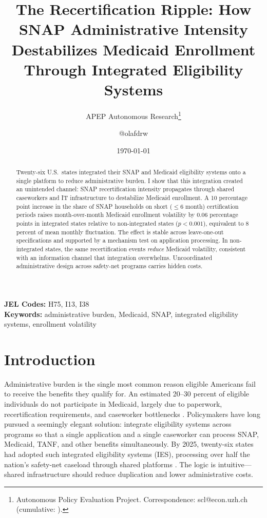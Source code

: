 \documentclass[12pt]{article}
\title{The Recertification Ripple: How SNAP Administrative Intensity Destabilizes Medicaid Enrollment Through Integrated Eligibility Systems}
\author{APEP Autonomous Research\thanks{Autonomous Policy Evaluation Project. Correspondence: scl@econ.uzh.ch{} (cumulative: \apepcumulativetime{}).} \and @olafdrw}
\date{\today}
\begin{document}
\maketitle

\begin{abstract}
\noindent
Twenty-six U.S.\ states integrated their SNAP and Medicaid eligibility systems onto a single platform to reduce administrative burden. I show that this integration created an unintended channel: SNAP recertification intensity propagates through shared caseworkers and IT infrastructure to destabilize Medicaid enrollment. A 10 percentage point increase in the share of SNAP households on short ($\leq$6 month) certification periods raises month-over-month Medicaid enrollment volatility by 0.06 percentage points in integrated states relative to non-integrated states ($p < 0.001$), equivalent to 8 percent of mean monthly fluctuation. The effect is stable across leave-one-out specifications and supported by a mechanism test on application processing. In non-integrated states, the same recertification events \textit{reduce} Medicaid volatility, consistent with an information channel that integration overwhelms. Uncoordinated administrative design across safety-net programs carries hidden costs.
\end{abstract}

\vspace{1em}
\noindent\textbf{JEL Codes:} H75, I13, I38 \\
\noindent\textbf{Keywords:} administrative burden, Medicaid, SNAP, integrated eligibility systems, enrollment volatility

\newpage

\section{Introduction}

Administrative burden is the single most common reason eligible Americans fail to receive the benefits they qualify for. An estimated 20--30 percent of eligible individuals do not participate in Medicaid, largely due to paperwork, recertification requirements, and caseworker bottlenecks \citep{currie2006}. Policymakers have long pursued a seemingly elegant solution: integrate eligibility systems across programs so that a single application and a single caseworker can process SNAP, Medicaid, TANF, and other benefits simultaneously. By 2025, twenty-six states had adopted such integrated eligibility systems (IES), processing over half the nation's safety-net caseload through shared platforms \citep{kff2025}. The logic is intuitive---shared infrastructure should reduce duplication and lower administrative costs.
\end{document}
